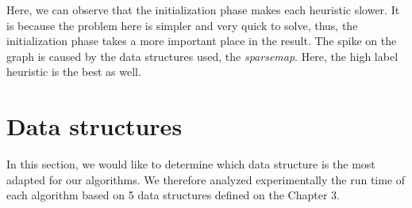Here, we can observe that the initialization phase makes each heuristic slower. It is because the problem here is simpler and very quick to solve, thus, the initialization phase takes a more important place in the result. The spike on the graph is caused by the data structures used, the \textit{sparsemap}. Here, the high label heuristic is the best as well.



\section{Data structures}
In this section, we would like to determine which data structure is the most adapted for our algorithms. We therefore analyzed experimentally the run time of each algorithm based on 5 data structures defined on the Chapter 3.
